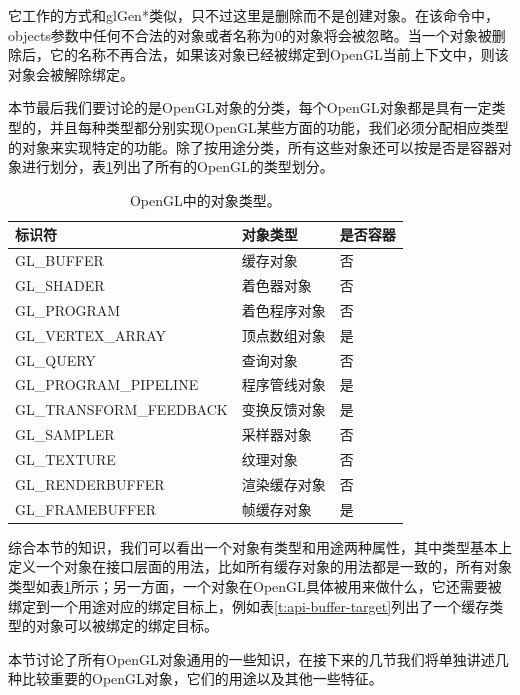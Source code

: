 它工作的方式和glGen*类似，只不过这里是删除而不是创建对象。在该命令中，objects参数中任何不合法的对象或者名称为0的对象将会被忽略。当一个对象被删除后，它的名称不再合法，如果该对象已经被绑定到OpenGL当前上下文中，则该对象会被解除绑定。

本节最后我们要讨论的是OpenGL对象的分类，每个OpenGL对象都是具有一定类型的，并且每种类型都分别实现OpenGL某些方面的功能，我们必须分配相应类型的对象来实现特定的功能。除了按用途分类，所有这些对象还可以按是否是容器对象进行划分，表\ref{t:api-object-types}列出了所有的OpenGL的类型划分。

\begin{table}
\caption{OpenGL中的对象类型。}
\label{t:api-object-types}
\centering
\begin{tabular}{>{\small}p{}|>{\small}p{}|>{\small}p{}}
\hline 
   标识符 & 对象类型 & 是否容器  \\
    \hline  
  GL\_BUFFER              &缓存对象 &否\\
  GL\_SHADER              &着色器对象 &否\\
  GL\_PROGRAM             &着色程序对象 &否\\
  GL\_VERTEX\_ARRAY       &顶点数组对象 &是\\
  GL\_QUERY               &查询对象 &否\\
  GL\_PROGRAM\_PIPELINE   &程序管线对象 &是\\
  GL\_TRANSFORM\_FEEDBACK &变换反馈对象 &是\\
  GL\_SAMPLER             &采样器对象 &否\\
  GL\_TEXTURE             &纹理对象 &否\\
  GL\_RENDERBUFFER        &渲染缓存对象 &否\\
  GL\_FRAMEBUFFER         &帧缓存对象 &是\\

 \hline 
\end{tabular}
\end{table}

综合本节的知识，我们可以看出一个对象有类型和用途两种属性，其中类型基本上定义一个对象在接口层面的用法，比如所有缓存对象的用法都是一致的，所有对象类型如表\ref{t:api-object-types}所示；另一方面，一个对象在OpenGL具体被用来做什么，它还需要被绑定到一个用途对应的绑定目标上，例如表\ref{t:api-buffer-target}列出了一个缓存类型的对象可以被绑定的绑定目标。

本节讨论了所有OpenGL对象通用的一些知识，在接下来的几节我们将单独讲述几种比较重要的OpenGL对象，它们的用途以及其他一些特征。





